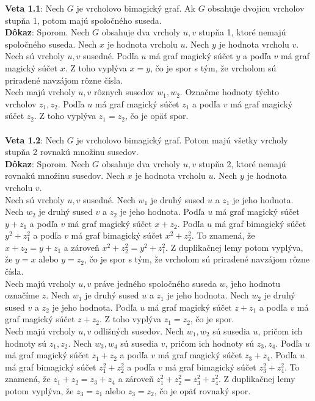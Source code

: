\documentclass[12pt]{article}
\begin{document}
\textbf{Veta 1.1}: Nech $G$ je vrcholovo bimagický graf. Ak $G$ obsahuje dvojicu vrcholov stupňa 1, potom majú spoločného suseda. \\

\textbf{Dôkaz}: Sporom. Nech $G$ obsahuje dva vrcholy $u,v$ stupňa 1, ktoré nemajú spoločného suseda. Nech $x$ je hodnota vrcholu $u$. Nech $y$ je hodnota vrcholu $v$. \\

Nech sú vrcholy $u,v$ susedné. Podľa $u$ má graf magický súčet $y$ a podľa $v$ má graf magický súčet $x$. Z toho vyplýva $x = y$, čo je spor s tým, že vrcholom sú priradené navzájom rôzne čísla. \\

Nech majú vrcholy $u,v$ rôznych susedov $w_1, w_2$. Označme hodnoty týchto vrcholov $z_1, z_2$. Podľa $u$ má graf magický súčet $z_1$ a podľa $v$ má graf magický súčet $z_2$. Z toho vyplýva $z_1 = z_2$, čo je opäť spor. \\\\

\textbf{Veta 1.2}: Nech $G$ je vrcholovo bimagický graf. Potom majú všetky vrcholy stupňa 2 rovnakú množinu susedov. \\

\textbf{Dôkaz}: Sporom. Nech $G$ obsahuje dva vrcholy $u,v$ stupňa 2, ktoré nemajú rovnakú množinu susedov. Nech $x$ je hodnota vrcholu $u$. Nech $y$ je hodnota vrcholu $v$. \\

Nech sú vrcholy $u,v$ susedné. Nech $w_1$ je druhý sused $u$ a $z_1$ je jeho hodnota. Nech $w_2$ je druhý sused $v$ a $z_2$ je jeho hodnota. Podľa $u$ má graf magický súčet $y + z_1$ a podľa $v$ má graf magický súčet $x + z_2$. Podľa $u$ má graf bimagický súčet $y^2 + z^2_1$ a podľa $v$ má graf bimagický súčet $x^2 + z^2_2$.  To znamená, že $x + z_2 = y + z_1$ a zároveň $x^2 + z^2_2 = y^2 + z^2_1$. Z duplikačnej lemy potom vyplýva, že $y = x$ alebo $y = z_2$, čo je spor s tým, že vrcholom sú priradené navzájom rôzne čísla. \\

Nech majú vrcholy $u,v$ práve jedného spoločného suseda $w$, jeho hodnotu označíme $z$. Nech $w_1$ je druhý sused $u$ a $z_1$ je jeho hodnota. Nech $w_2$ je druhý sused $v$ a $z_2$ je jeho hodnota. Podľa $u$ má graf magický súčet $z + z_1$ a podľa $v$ má graf magický súčet $z + z_2$. Z toho vyplýva $z_1 = z_2$, čo je spor. \\

Nech majú vrcholy $u,v$ odlišných susedov. Nech $w_1, w_2$ sú susedia $u$, pričom ich hodnoty sú $z_1, z_2$. Nech $w_3, w_4$ sú susedia $v$, pričom ich hodnoty sú $z_3, z_4$. Podľa $u$ má graf magický súčet $z_1 + z_2$ a podľa $v$ má graf magický súčet $z_3 + z_4$. Podľa $u$ má graf bimagický súčet $z^2_1 + z^2_2$ a podľa $v$ má graf bimagický súčet $z^2_3 + z^2_4$. To znamená, že $z_1 + z_2 = z_3 + z_4$ a zároveň $z^2_1 + z^2_2 = z^2_3 + z^2_4$. Z duplikačnej lemy potom vyplýva, že $z_3 = z_1$ alebo $z_3 = z_2$, čo je opäť rovnaký spor. \\\\
\end{document}
